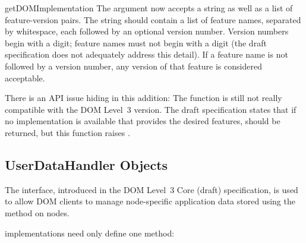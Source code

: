 \documentclass{howto}
\begin{document}
\begin{funcdesc}{getDOMImplementation}{}
  The  argument now accepts a string as well as a list
  of feature-version pairs.  The string should contain a list of
  feature names, separated by whitespace, each followed by an optional
  version number.  Version numbers begin with a digit; feature names
  must not begin with a digit (the draft specification does not
  adequately address this detail).  If a feature name is not followed
  by a version number, any version of that feature is considered
  acceptable.

  \begin{notice}
    There is an API issue hiding in this addition:  The function is
    still not really compatible with the DOM Level~3 version.  The
    draft specification states that if no implementation is available
    that provides the desired features,  should be
    returned, but this function raises .
  \end{notice}
\end{funcdesc}


\subsection{UserDataHandler Objects \label{userdatahandler}}

The  interface, introduced in the DOM Level~3
Core (draft) specification, is used to allow DOM clients to manage
node-specific application data stored using the 
method on nodes.

 implementations need only define one method:
\end{document}
